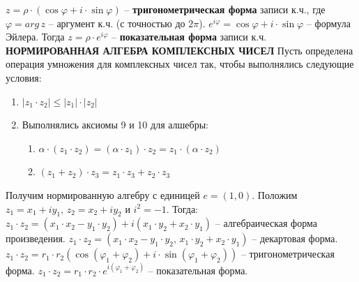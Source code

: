 \documentclass{article}
\begin{document}
$z=\rho\cdot(\cos\varphi+i\cdot\sin\varphi)$ -- \textbf{тригонометрическая форма} записи к.ч., где $\varphi=arg\,z$ -- аргумент к.ч. (с точностью до $2\pi$).
\newline
\newline
$e^{i\varphi}=\cos\varphi+i\cdot\sin\varphi$ -- формула Эйлера. Тогда $z=\rho\cdot e^{i\varphi}$ -- \textbf{показательная форма} записи к.ч.
\newpage
\textbf{НОРМИРОВАННАЯ АЛГЕБРА КОМПЛЕКСНЫХ ЧИСЕЛ}
\newline
\newline
Пусть определена операция умножения для комплексных чисел так, чтобы выполнялись следующие условия:
\begin{enumerate}
    \item $|z_1\cdot z_2|\leqslant|z_1|\cdot|z_2|$
    \item Выполнялись аксиомы 9 и 10 для алшебры:
    \begin{enumerate}
        \item $\alpha\cdot(z_1\cdot z_2)=(\alpha\cdot z_1)\cdot z_2=z_1\cdot(\alpha\cdot z_2)$
        \item $(z_1+z_2)\cdot z_3=z_1\cdot z_3+z_2\cdot z_3$
    \end{enumerate}
\end{enumerate}
Получим нормированную алгебру с единицей $e=(1,0)$.
\newline
\newline
Положим $z_1=x_1+iy_1,\,z_2=x_2+iy_2$ и $i^2=-1$. Тогда:
\newline 
$z_1\cdot z_2=(x_1\cdot x_2-y_1\cdot y_2)+i(x_1\cdot y_2+x_2\cdot y_1)$ -- алгебраическая форма произведения. 
\newline 
$z_1\cdot z_2=(x_1\cdot x_2-y_1\cdot y_2,\,x_1\cdot y_2+x_2\cdot y_1)$ -- декартовая форма. 
\newline $z_1\cdot z_2=r_1\cdot r_2(\cos(\varphi_1+\varphi_2)+i\cdot\sin(\varphi_1+\varphi_2))$ -- тригонометрическая форма. 
\newline 
$z_1\cdot z_2=r_1\cdot r_2\cdot e^{i(\varphi_1+\varphi_2)}$ -- показательная форма.
\newline
\newline
\end{document}
